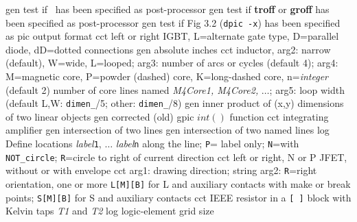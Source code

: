   {gen}
  {test if \PSTricks~has been specified as post-processor}
  {gen}
  {test if {\bf troff} or {\bf groff} has been specified as post-processor}
  {gen}
  {test if Fig 3.2 ({\tt dpic -x}) has been specified as pic output format}
  {cct}
  {left or right IGBT, L=alternate gate type, D=parallel diode,
   dD=dotted connections }
  {gen}
  {absolute inches}
  {cct}
  {inductor, arg2: narrow (default), W=wide, L=looped;
   arg3: number of arcs or cycles (default 4);
   arg4: M=magnetic core, P=powder (dashed) core, K=long-dashed core,
     n={\sl integer} (default 2) number of core lines named
     {\sl M4Core1, M4Core2,} $\ldots$;
   arg5: loop width (default L,W: {\tt dimen\_}/5; other: {\tt dimen\_}/8)
   }
  {gen}
  {inner product of (x,y) dimensions of two linear objects}
  {gen}
  {corrected (old) gpic $int()$ function}
  {cct}
  {integrating amplifier}
  {gen}
  {intersection of two lines}
  {gen}
  {intersection of two named lines}
  {log}
  {Define locations {\sl label}{\tt 1}, $\ldots$ {\sl label}{\tt n}
    along the line; {\tt P}= label only;
    {\tt N}=with {\tt NOT\_circle};
    {\tt R}=circle to right of current direction }
%
  {cct}
  {left or right, N or P JFET, without or with envelope
    }
  {cct}
  {arg1: drawing direction; string arg2: {\tt R}=right orientation,
   one or more {\tt L[M][B]} for L and auxiliary contacts with make or break
   points; {\tt S[M][B]} for S and auxiliary contacts
   }
%
  {cct}
  {IEEE resistor in a {\tt [ ]} block with Kelvin taps {\sl T1} and {\sl T2}
   }
%
  {log}
  {logic-element grid size}
